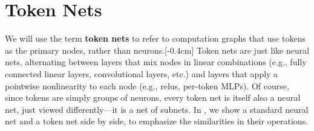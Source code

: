 


\section{Token Nets}

We will use the term \textbf{token nets} to refer to computation graphs that use tokens as the primary nodes, rather than neurons.[-0.4cm] Token nets are just like neural nets, alternating between layers that mix nodes in linear combinations (e.g., fully connected linear layers, convolutional layers, etc.) and layers that apply a pointwise nonlinearity to each node (e.g., relus, per-token MLPs). Of course, since tokens are simply groups of neurons, every token net is itself also a neural net, just viewed differently—it is a net of subnets. In \fig{\ref{fig:transformers:neural_nets_vs_token_nets}}, we show a standard neural net and a token net side by side, to emphasize the similarities in their operations.

